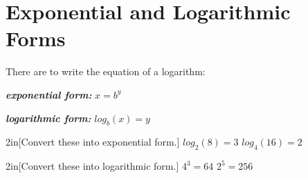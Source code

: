 \section{Exponential and Logarithmic Forms}


There are  to write the equation of a logarithm:
\begin{tcbraster}[
    raster equal height,
    raster left skip=2in, raster right skip=2in,
    raster before skip=\onelineskip, raster after skip=\onelineskip,
    ]
    \begin{tcolorbox}
        {\bfseries\itshape exponential form:}
        \centering\large
        $x = b^y $
    \end{tcolorbox}
    \begin{tcolorbox}
        {\bfseries\itshape logarithmic form:}
        \centering\large
        $log_b(x) = y $
    \end{tcolorbox}
\end{tcbraster}

\begin{my2Problems}{2in}[Convert these into exponential form.]
    {
        $log_2(8) = 3$
    }
    {
        $log_{4}(16) = 2$
    }
\end{my2Problems}


\begin{my2Problems}{2in}[Convert these into logarithmic form.]
    {
        $4^3 = 64$
    }
    {
        $2^5 = 256$
    }
\end{my2Problems}